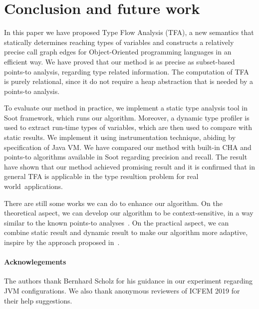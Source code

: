 \documentclass{fac}
\begin{document}
\section{Conclusion and future work}\label{sec:conclusion}
In this paper we have proposed Type Flow Analysis (TFA), a new semantics that statically determines reaching types of variables and constructs a relatively precise call graph edges for Object-Oriented programming languages in an efficient way. We have proved that our method is as precise as subset-based points-to analysis, regarding type related information. The computation of TFA is purely relational, since it do not require a heap abstraction that is needed by a points-to analysis.

To evaluate our method in practice, we implement a static type analysis tool in Soot framework, which runs our algorithm. Moreover, a dynamic type profiler is used to extract run-time types of variables, which are then used to compare with static results. We implement it using instrumentation technique, abiding by specification of Java VM. We have compared our method with built-in CHA and points-to algorithms available in Soot regarding precision and recall. The result have shown that our method achieved promising result and it is confirmed that in general TFA is applicable in the type resultion problem for real world~applications.

There are still some works we can do to enhance our algorithm. On the theoretical aspect, we can develop our algorithm to be context-sensitive, in a way similar to the known points-to analyses~\cite{Milanova2005,Smaragdakis11}. On the practical aspect, we can combine static result and dynamic result to make our algorithm more adaptive, inspire by the approach proposed in~\cite{Codrut2014}.

\paragraph{Acknowlegements} The authors thank Bernhard Scholz for his guidance in our experiment regarding JVM configurations. We also thank anonymous reviewers of ICFEM 2019 for their help suggestions.
\label{lastpage}



\end{document}

